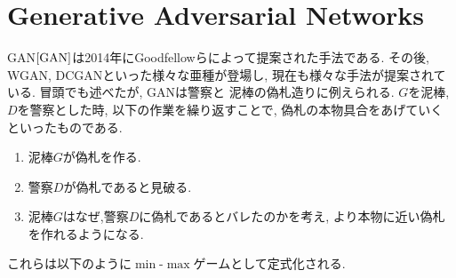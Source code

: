 \documentclass[11pt, a4paper, dvipdfmx]{jsarticle}
\theoremstyle{definition}
\begin{document}
\section{Generative Adversarial Networks}
GAN$\cite{GAN}$は2014年にGoodfellowらによって提案された手法である. 
その後, WGAN, DCGANといった様々な亜種が登場し, 現在も様々な手法が提案されている.
冒頭でも述べたが, GANは警察と
泥棒の偽札造りに例えられる. $G$を泥棒, $D$を警察とした時, 以下の作業を繰り返すことで, 偽札の本物具合をあげていくといったものである.
\begin{enumerate}
    \item 泥棒$G$が偽札を作る.
    \item 警察$D$が偽札であると見破る.
    \item 泥棒$G$はなぜ,警察$D$に偽札であるとバレたのかを考え, より本物に近い偽札を作れるようになる.
\end{enumerate}
これらは以下のように$\min$-$\max$ゲームとして定式化される.
\end{document}
